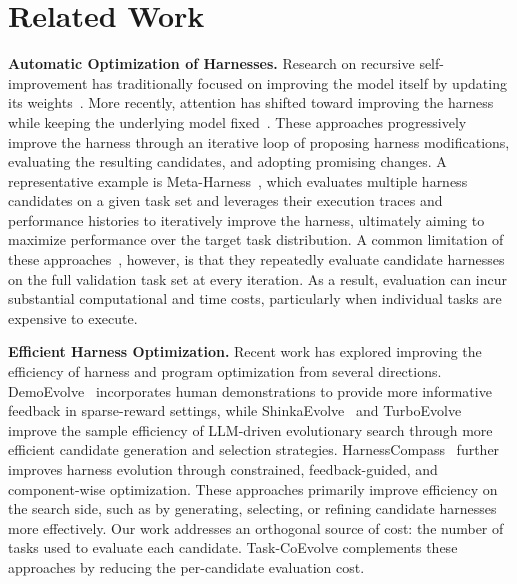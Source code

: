 \documentclass{article} %
\begin{document}
\section{Related Work}
\label{sec:related_work}

\textbf{Automatic Optimization of Harnesses.}
Research on recursive self-improvement has traditionally focused on improving the model itself by updating its weights~\citep{huang-etal-2023-large, pmlr-v235-yuan24d, NEURIPS2025_6b41e04c, NEURIPS2022_639a9a17}. More recently, attention has shifted toward improving the harness while keeping the underlying model fixed~\citep{lee2026meta, lin2026agentic, nie2026tthe, zhang2026harnessing}. These approaches progressively improve the harness through an iterative loop of proposing harness modifications, evaluating the resulting candidates, and adopting promising changes. A representative example is Meta-Harness~\citep{lee2026meta}, which evaluates multiple harness candidates on a given task set and leverages their execution traces and performance histories to iteratively improve the harness, ultimately aiming to maximize performance over the target task distribution. A common limitation of these approaches~\citep{lee2026meta, lin2026agentic, zhang2026harnessing}, however, is that they repeatedly evaluate candidate harnesses on the full validation task set at every iteration. As a result, evaluation can incur substantial computational and time costs, particularly when individual tasks are expensive to execute.


\textbf{Efficient Harness Optimization.}
Recent work has explored improving the efficiency of harness and program optimization from several directions. DemoEvolve~\citep{che2026demoevolve} incorporates human demonstrations to provide more informative feedback in sparse-reward settings, while ShinkaEvolve~\citep{lange2025shinkaevolve} and TurboEvolve~\citep{yang2026turboevolve} improve the sample efficiency of LLM-driven evolutionary search through more efficient candidate generation and selection strategies. HarnessCompass~\citep{zhang2026harnesscompass} further improves harness evolution through constrained, feedback-guided, and component-wise optimization. These approaches primarily improve efficiency on the search side, such as by generating, selecting, or refining candidate harnesses more effectively. Our work addresses an orthogonal source of cost: the number of tasks used to evaluate each candidate. Task-CoEvolve complements these approaches by reducing the per-candidate evaluation cost.
\end{document}
